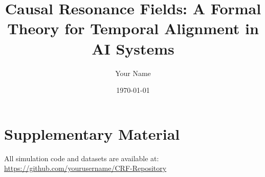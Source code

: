 \documentclass[10pt, twocolumn]{article}
\title{Causal Resonance Fields: A Formal Theory for Temporal Alignment in AI Systems}
\author{Your Name}
\date{\today}
\begin{document}
\maketitle
















\section*{Supplementary Material}
All simulation code and datasets are available at:\\
\url{https://github.com/yourusername/CRF-Repository}
\end{document}
